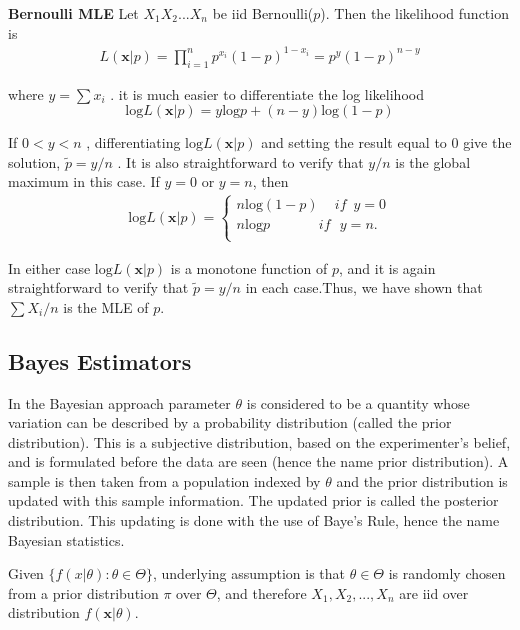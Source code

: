 \documentclass[a4paper,english,12pt]{article}
\begin{document}
\begin{exmp}\textbf{Bernoulli MLE}
Let $X_1X_2...X_n$ be iid Bernoulli($p$). Then the likelihood function is
\begin{align}
L(\textbf{x}|p)=\prod\limits_{i=1}^n p^{x_i}(1-p)^{1-x_i}=p^{y}(1-p)^{n-y}
\end{align} 


where ${y}=\sum x_i$       . it is much easier to differentiate the log likelihood 
$$\mathrm{log}L(\textbf{x}|p)={y}\mathrm{log}p + (n-{y}	)\mathrm{log}(1-p)$$


If $0<y<n$     , differentiating $\mathrm{log}L(\textbf{x}|p)$    and setting the result equal to $0$ give the solution, $\tilde{p}=y/n$   . It is also straightforward to verify that $y/n$   is the global maximum in this case. If $y=0$   or $y=n$, then
\begin{align}
\mathrm{log}L(\textbf{x}|p) = 
\begin{cases}
n\mathrm{log}(1-p)\,\,\,\,\,\,\,if\,\,\, y=0\\
n\mathrm{log}p\,\,\,\,\,\,\,\,\,\,\,\,\,\,\,\,\,\,\,\,\,if\,\,\,\, y=n.\\
\end{cases}
\end{align}



In either case $\mathrm{log}L(\textbf{x}|p)$   is a monotone function of $p$, and it is again straightforward to verify that $\tilde{p}=y/n$  in each case.Thus, we have shown that $\sum {X_i}/n$  is the MLE of $p$.

\end{exmp}

\subsection{Bayes Estimators}

In the Bayesian approach parameter $\theta$ is considered to be a quantity whose variation can be described by a probability distribution (called the prior distribution). This is a subjective distribution, based on the experimenter's belief, and is formulated before the data are seen (hence the name prior distribution). A sample is then taken from a population indexed by $\theta$ and the prior distribution is updated with this sample information. The updated prior is called the posterior distribution.  This updating is done with the use of Baye's Rule, hence the name Bayesian statistics.

Given $\{f(x|\theta):\theta \in \Theta\}$, underlying assumption is that $\theta \in \Theta$ is randomly chosen from a prior distribution $\pi$ over $\Theta$, and therefore $X_1,X_2,...,X_n$ are iid over distribution $f(\textbf{x}|\theta)$.\\
\end{document}
